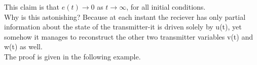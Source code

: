\documentclass{article}
\newcommand\tab[1][1cm]{\hspace*{#1}}
\begin{document}
This claim is that $e(t) \to 0$ as $t \to \infty$, for all initial conditions. \\ \tab
Why is this astonishing? Because at each instant the reciever has only partial information about the state of the transmitter-it is driven solely by u(t), yet somehow it manages to reconstruct the other two transmitter variables v(t) and w(t) as well. \\ \tab
The proof is given in the following example.
\end{document}
